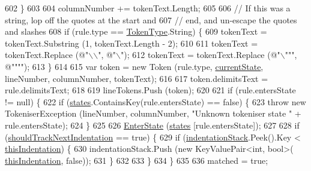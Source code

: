 \begin{DoxyCode}
602                     \}
603 
604                     columnNumber += tokenText.Length;
605 
606                     \textcolor{comment}{// If this was a string, lop off the quotes at the start and}
607                     \textcolor{comment}{// end, and un-escape the quotes and slashes}
608                     \textcolor{keywordflow}{if} (rule.type == \hyperlink{a00053_a301aa7c866593a5b625a8fc158bbeace}{TokenType}.String) \{
609                         tokenText = tokenText.Substring (1, tokenText.Length - 2);
610 
611                         tokenText = tokenText.Replace (\textcolor{stringliteral}{@"\(\backslash\)\(\backslash\)"}, \textcolor{stringliteral}{@"\(\backslash\)"});
612                         tokenText = tokenText.Replace (\textcolor{stringliteral}{@"\(\backslash\)"""}, \textcolor{stringliteral}{@""""});
613                     \}
614 
615                     var token = \textcolor{keyword}{new} Token (rule.type, \hyperlink{a00129_ac90b7dce8103425a148f9e8588f14137}{currentState}, lineNumber, columnNumber, 
      tokenText);
616 
617                     token.delimitsText = rule.delimitsText;
618 
619                     lineTokens.Push (token);
620 
621                     \textcolor{keywordflow}{if} (rule.entersState != null) \{
622                         \textcolor{keywordflow}{if} (\hyperlink{a00129_a2c65c0ba90f973e459583badefef216a}{states}.ContainsKey(rule.entersState) == \textcolor{keyword}{false}) \{
623                             \textcolor{keywordflow}{throw} \textcolor{keyword}{new} TokeniserException (lineNumber, columnNumber, \textcolor{stringliteral}{"Unknown tokeniser
       state "} + rule.entersState);
624                         \}
625 
626                         \hyperlink{a00129_ad3ef08f822b310d9864774b057b96995}{EnterState} (\hyperlink{a00129_a2c65c0ba90f973e459583badefef216a}{states} [rule.entersState]);
627 
628                         \textcolor{keywordflow}{if} (\hyperlink{a00129_ac670aac2245cbd4694dfbd5b69313218}{shouldTrackNextIndentation} == \textcolor{keyword}{true}) \{
629                             \textcolor{keywordflow}{if} (\hyperlink{a00129_a6631a1b1a9109258ab18927e7587ff9b}{indentationStack}.Peek().Key < 
      \hyperlink{a00351_a0e59365a4aa5811f6495b92a51e23573}{thisIndentation}) \{
630                                 indentationStack.Push (\textcolor{keyword}{new} KeyValuePair<int, bool>(
      \hyperlink{a00351_a0e59365a4aa5811f6495b92a51e23573}{thisIndentation}, \textcolor{keyword}{false}));
631                             \}
632 
633                         \}
634                     \}
635 
636                     matched = \textcolor{keyword}{true};

\end{DoxyCode}
